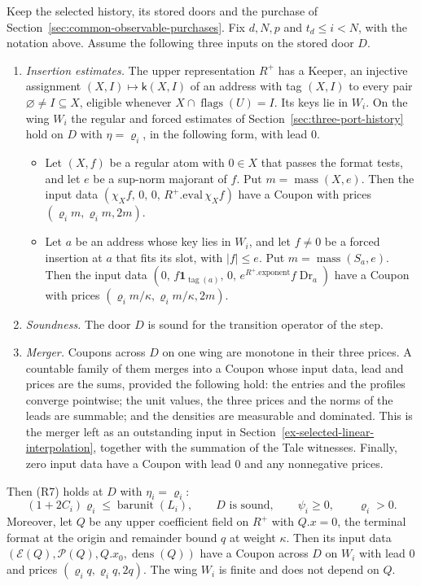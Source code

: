 \begin{proposition}
\label{prop:selected-zero-coordinate-coupon}
Keep the selected history, its stored doors and the purchase of
Section~\ref{sec:common-observable-purchases}. Fix $d,N,p$ and
$t_d\le i<N$, with the notation above. Assume the following three
inputs on the stored door $D$.
\begin{enumerate}
\item[(K)] \emph{Insertion estimates.} The upper representation $R^+$
  has a Keeper, an injective assignment $(X,I)\mapsto\mathsf k(X,I)$
  of an address with tag $(X,I)$ to every pair
  $\varnothing\ne I\subseteq X$, eligible whenever
  $X\cap\operatorname{flags}(U)=I$. Its keys lie in $W_i$. On the wing
  $W_i$ the regular and forced estimates of
  Section~\ref{sec:three-port-history} hold on $D$ with $\eta=\varrho_i$,
  in the following form, with lead $0$.
  \begin{itemize}
  \item Let $(X,f)$ be a regular atom with $0\in X$ that passes the
    format tests, and let $e$ be a sup-norm majorant of $f$. Put
    $m=\operatorname{mass}(X,e)$. Then the input data
    $(\chi_Xf,\,0,\,0,\,R^+.\mathrm{eval}\,\chi_Xf)$ have a Coupon with
    prices $(\varrho_im,\varrho_im,2m)$.
  \item Let $a$ be an address whose key lies in $W_i$, and let
    $f\ne0$ be a forced insertion at $a$ that fits its slot, with
    $|f|\le e$. Put $m=\operatorname{mass}(S_a,e)$. Then the input data
    $(0,\,f\mathbf 1_{\operatorname{tag}(a)},\,0,\,
    e^{R^+.\mathrm{exponent}}f\operatorname{Dr}_a)$ have a Coupon with
    prices $(\varrho_im/\kappa,\varrho_im/\kappa,2m)$.
  \end{itemize}
\item[(S)] \emph{Soundness.} The door $D$ is sound for the transition
  operator of the step.
\item[(M)] \emph{Merger.} Coupons across $D$ on one wing are monotone
  in their three prices. A countable family of them merges into a
  Coupon whose input data, lead and prices are the sums, provided the
  following hold: the entries and the profiles converge pointwise; the
  unit values, the three prices and the norms of the leads are
  summable; and the densities are measurable and dominated. This is the
  merger left as an outstanding input in
  Section~\ref{ex-selected-linear-interpolation}, together with the
  summation of the Tale witnesses. Finally, zero input data have a
  Coupon with lead $0$ and any nonnegative prices.
\end{enumerate}
Then (R7) holds at $D$ with $\eta_i=\varrho_i$:
\[
 (1+2C_i)\varrho_i\le\operatorname{barunit}(L_i),\qquad
 D\text{ is sound},\qquad \psi_i\ge0,\qquad \varrho_i>0.
\]
Moreover, let $Q$ be any upper coefficient field on $R^+$ with
$Q.x=0$, the terminal format at the origin and remainder bound $q$ at
weight $\kappa$. Then its input data
$(\mathcal E(Q),\mathcal P(Q),Q.x_0,\operatorname{dens}(Q))$ have a
Coupon across $D$ on $W_i$ with lead $0$ and prices
$(\varrho_iq,\varrho_iq,2q)$. The wing $W_i$ is finite and does not
depend on $Q$.
\end{proposition}

